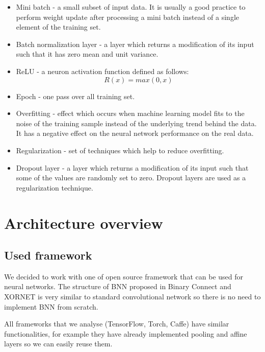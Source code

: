 \documentclass[licencjacka]{pracamgr}
\begin{document}
\begin{itemize}
        \item Mini batch - a small subset of input data. It is usually a good practice to perform weight update after processing a mini batch instead of a single element of the training set.
        
        \item Batch normalization layer - a layer which returns a modification of its input such 
        that it has zero mean and unit variance.
        
        \item ReLU - a neuron activation function defined as follows: $$ R(x) = max(0,x) $$
        
        \item Epoch - one pass over all training set.
        
        \item Overfitting - effect which occurs when machine learning model fits to the noise of the training sample instead of the underlying trend behind the data. It has a negative effect on the neural network performance on the real data.
        
        \item Regularization - set of techniques which help to reduce overfitting.
        
        \item Dropout layer - a layer which returns a modification of its input such that some of the values are randomly set to zero. Dropout layers are used as a regularization technique.   
    \end{itemize}

\chapter{Architecture overview}

	\section{Used framework}

		We decided to work with one of open source framework that can be used for neural networks. The structure of BNN proposed in Binary Connect \cite{binaryConnect} and XORNET \cite{xornet} is very similar to standard convolutional network so there is no need to implement BNN from scratch. 
		
		All frameworks that we analyse (TensorFlow, Torch, Caffe) have similar functionalities, for example they have already implemented pooling and affine layers so we can easily reuse them. 
\end{document}
